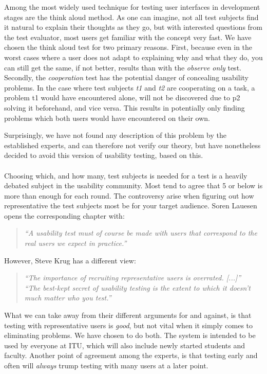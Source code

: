 Among the most widely used technique for testing user interfaces in development stages are the think aloud method.\cite{steve} As one can imagine, not all test subjects find it natural to explain their thoughts as they go, but with interested questions from the test evaluator, most users get familiar with the concept very fast. We have chosen the think aloud test for two primary reasons.
First, because even in the worst cases where a user does not adapt to explaining why and what they do, you can still get the same, if not better, results than with the \emph{observe only} test.
Secondly, the \emph{cooperation} test has the potential danger of concealing usability problems. In the case where test subjects \emph{t1} and \emph{t2} are cooperating on a task, a problem t1 would have encountered alone, will not be discovered due to p2 solving it beforehand, and vice versa. This results in potentially only finding problems which both users would have encountered on their own. 

Surprisingly, we have not found any description of this problem by the established experts, and can therefore not verify our theory, but have nonetheless decided to avoid this version of usability testing, based on this. \\
\\
Choosing which, and how many, test subjects is needed for a test is a heavily debated subject in the usability community. Most tend to agree that 5 or below is more than enough for each round. The controversy arise when figuring out how representative the test subjects most be for your target audience. Soren Lauesen opens the corresponding chapter with: \cite{lauesen}
\begin{quotation}
\noindent \emph{``A usability test must of course be made with users that correspond to the real users we expect in practice.''}
\end{quotation}
However, Steve Krug has a different view: \cite{steve}
\begin{quotation}
\noindent \emph{``The importance of recruiting representative users is overrated. [...]''} \\
\noindent \emph{``The best-kept secret of usability testing is the extent to which it doesn't much matter who you test.''}
\end{quotation}

What we can take away from their different arguments for and against, is that testing with representative users is \emph{good}, but not vital when it simply comes to eliminating problems.
We have chosen to do both. The system is intended to be used by everyone at ITU, which will also include newly started students and faculty.
Another point of agreement among the experts, is that testing early and often will \emph{always} trump testing with many users at a later point. \cite{lauesen,steve,nielsen_five_users}

